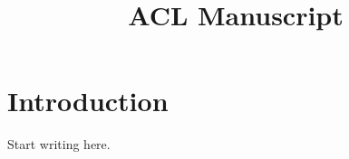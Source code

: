 \documentclass[11pt]{article}
\title{ACL Manuscript}
\author{}
\date{}
\begin{document}
\maketitle
\section{Introduction}
Start writing here.


\end{document}
